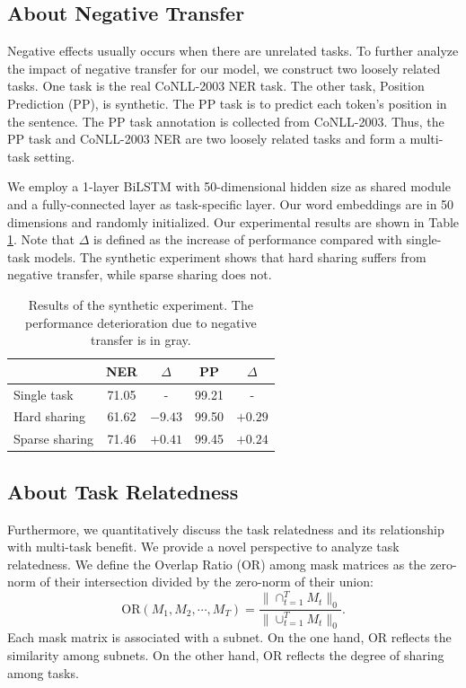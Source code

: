 \documentclass[letterpaper]{article} %
\begin{document}
\subsection{About Negative Transfer}
Negative effects usually occurs when there are unrelated tasks. To further analyze the impact of negative transfer for our model, we construct two loosely related tasks. One task is the real CoNLL-2003 NER task. The other task, Position Prediction (PP), is synthetic. The PP task is to predict each token's position in the sentence. The PP task annotation is collected from CoNLL-2003. Thus, the PP task and CoNLL-2003 NER are two loosely related tasks and form a multi-task setting.

We employ a 1-layer BiLSTM with 50-dimensional hidden size as shared module and a fully-connected layer as task-specific layer. Our word embeddings are in 50 dimensions and randomly initialized. Our experimental results are shown in Table \ref{tb:task_rel}. Note that $\Delta$ is defined as the increase of performance compared with single-task models. The synthetic experiment shows that hard sharing suffers from negative transfer, while sparse sharing does not.

\begin{table}[htbp]
\centering
\begin{tabular}{l|cc|cc}
\toprule
 & NER & $\Delta$ & PP & $\Delta$ \\ \midrule
Single task & 71.05 & - & 99.21 & - \\
Hard sharing & {\cellcolor[HTML]{D6D6D6}61.62} & {\cellcolor[HTML]{D6D6D6} $-9.43$} & 99.50 & $+0.29$ \\
Sparse sharing & 71.46 & $+0.41$ & 99.45 & $+0.24$ \\ \bottomrule
\end{tabular}
\caption{Results of the synthetic experiment. The performance deterioration due to negative transfer is in gray.}
\label{tb:task_rel}
\end{table}

\subsection{About Task Relatedness}

Furthermore, we quantitatively discuss the task relatedness and its relationship with multi-task benefit. We provide a novel perspective to analyze task relatedness.
We define the Overlap Ratio (OR) among mask matrices as the zero-norm of their intersection divided by the zero-norm of their union:
\begin{equation}\label{eq:or}
    \mathrm{OR}(M_1, M_2, \cdots, M_T) = \frac{\| \cap_{t=1}^TM_t\|_0}{\|\cup_{t=1}^TM_t\|_0}.
\end{equation}
Each mask matrix is associated with a subnet. On the one hand, OR reflects the similarity among subnets. On the other hand, OR reflects the degree of sharing among tasks.
\end{document}
